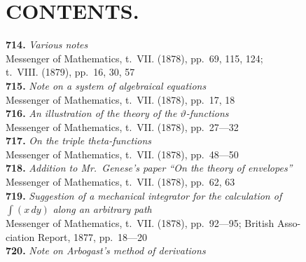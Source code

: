\documentclass[11pt,a4paper]{book}
\begin{document}
\cleardoublepage

\chapter*{CONTENTS.}

\textbf{714.} \textit{Various notes} \\
\hspace*{2em}Messenger of Mathematics, t.~VII. (1878), pp.~69, 115, 124;\\
\hspace*{2em}t.~VIII. (1879), pp.~16, 30, 57\\[0.3em]
\textbf{715.} \textit{Note on a system of algebraical equations} \\
\hspace*{2em}Messenger of Mathematics, t.~VII. (1878), pp.~17, 18\\[0.3em]
\textbf{716.} \textit{An illustration of the theory of the $\vartheta$-functions} \\
\hspace*{2em}Messenger of Mathematics, t.~VII. (1878), pp.~27---32\\[0.3em]
\textbf{717.} \textit{On the triple theta-functions} \\
\hspace*{2em}Messenger of Mathematics, t.~VII. (1878), pp.~48---50\\[0.3em]
\textbf{718.} \textit{Addition to Mr.~Genese's paper ``On the theory of envelopes''} \\
\hspace*{2em}Messenger of Mathematics, t.~VII. (1878), pp.~62, 63\\[0.3em]
\textbf{719.} \textit{Suggestion of a mechanical integrator for the calculation of}\\
\hspace*{2em}$\int(x\,dy)$ \textit{along an arbitrary path} \\
\hspace*{2em}Messenger of Mathematics, t.~VII. (1878), pp.~92---95; British Asso-\\
\hspace*{2em}ciation Report, 1877, pp.~18---20\\[0.3em]
\textbf{720.} \textit{Note on Arbogast's method of derivations} \\
\end{document}
